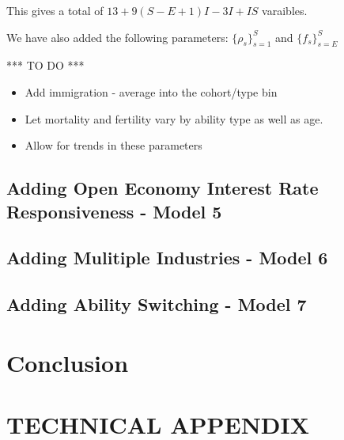 \documentclass[letterpaper,12pt]{article}
\theoremstyle{definition}
\numberwithin{equation}{section}
\begin{document}
\begin{spacing}{1.5}
    This gives a total of $13 + 9(S-E+1)I - 3I + IS$ varaibles.

    We have also added the following parameters: $\{\rho_s\}_{s=1}^S$ and $\{f_s\}_{s=E}^S$

    *** TO DO ***
    \begin{itemize}
    \item Add immigration - average into the cohort/type bin
    \item Let mortality and fertility vary by ability type as well as age.
    \item Allow for trends in these parameters
    \end{itemize}

  \newpage


  \subsection{Adding Open Economy Interest Rate Responsiveness - Model 5}\label{SubSec_Macro_Open}

  \subsection{Adding Mulitiple Industries - Model 6}\label{SubSec_Macro_Multi}

  \subsection{Adding Ability Switching - Model 7}\label{SubSec_Macro_Switch}

\section{Conclusion}\label{SecConclusion}


\end{spacing}


\newpage
\renewcommand{\theequation}{A.\arabic{section}.\arabic{equation}}
\renewcommand{\thedefinition}{A.\arabic{section}.\arabic{definition}}
\renewcommand{\thesection}{A-\arabic{section}}   %

\setcounter{equation}{0}                         %
\setcounter{section}{0}                          %
\section*{TECHNICAL APPENDIX}

\setcounter{definition}{0}
\setcounter{equation}{0}                         %




\newpage

\end{document}
